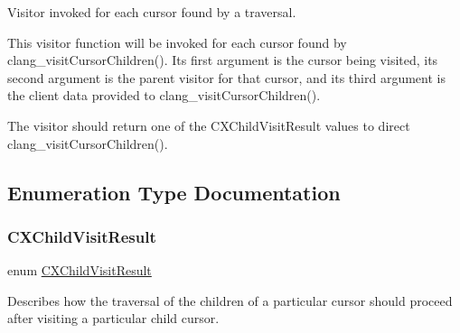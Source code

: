 Visitor invoked for each cursor found by a traversal. 

This visitor function will be invoked for each cursor found by clang\+\_\+visit\+Cursor\+Children(). Its first argument is the cursor being visited, its second argument is the parent visitor for that cursor, and its third argument is the client data provided to clang\+\_\+visit\+Cursor\+Children().

The visitor should return one of the {\ttfamily C\+X\+Child\+Visit\+Result} values to direct clang\+\_\+visit\+Cursor\+Children(). 

\subsection{Enumeration Type Documentation}
\mbox{\label{group__CINDEX__CURSOR__TRAVERSAL_ga99a9058656e696b622fbefaf5207d715}} 
\subsubsection{\texorpdfstring{C\+X\+Child\+Visit\+Result}{CXChildVisitResult}}
{\footnotesize\ttfamily enum \mbox{\hyperlink{group__CINDEX__CURSOR__TRAVERSAL_ga99a9058656e696b622fbefaf5207d715}{C\+X\+Child\+Visit\+Result}}}



Describes how the traversal of the children of a particular cursor should proceed after visiting a particular child cursor. 

